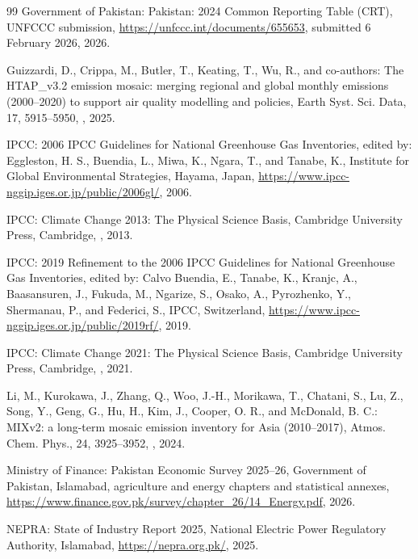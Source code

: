 \documentclass[essd,manuscript]{copernicus}
\begin{document}
\begin{thebibliography}{99}
Government of Pakistan: Pakistan: 2024 Common Reporting Table (CRT), UNFCCC submission, \url{https://unfccc.int/documents/655653}, submitted 6 February 2026, 2026.

Guizzardi, D., Crippa, M., Butler, T., Keating, T., Wu, R., and co-authors: The HTAP\_v3.2 emission mosaic: merging regional and global monthly emissions (2000--2020) to support air quality modelling and policies, Earth Syst. Sci. Data, 17, 5915--5950, , 2025.

IPCC: 2006 IPCC Guidelines for National Greenhouse Gas Inventories, edited by: Eggleston, H. S., Buendia, L., Miwa, K., Ngara, T., and Tanabe, K., Institute for Global Environmental Strategies, Hayama, Japan, \url{https://www.ipcc-nggip.iges.or.jp/public/2006gl/}, 2006.

IPCC: Climate Change 2013: The Physical Science Basis, Cambridge University Press, Cambridge, , 2013.

IPCC: 2019 Refinement to the 2006 IPCC Guidelines for National Greenhouse Gas Inventories, edited by: Calvo Buendia, E., Tanabe, K., Kranjc, A., Baasansuren, J., Fukuda, M., Ngarize, S., Osako, A., Pyrozhenko, Y., Shermanau, P., and Federici, S., IPCC, Switzerland, \url{https://www.ipcc-nggip.iges.or.jp/public/2019rf/}, 2019.

IPCC: Climate Change 2021: The Physical Science Basis, Cambridge University Press, Cambridge, , 2021.

Li, M., Kurokawa, J., Zhang, Q., Woo, J.-H., Morikawa, T., Chatani, S., Lu, Z., Song, Y., Geng, G., Hu, H., Kim, J., Cooper, O. R., and McDonald, B. C.: MIXv2: a long-term mosaic emission inventory for Asia (2010--2017), Atmos. Chem. Phys., 24, 3925--3952, , 2024.

Ministry of Finance: Pakistan Economic Survey 2025--26, Government of Pakistan, Islamabad, agriculture and energy chapters and statistical annexes, \url{https://www.finance.gov.pk/survey/chapter_26/14_Energy.pdf}, 2026.

NEPRA: State of Industry Report 2025, National Electric Power Regulatory Authority, Islamabad, \url{https://nepra.org.pk/}, 2025.


\end{thebibliography}
\end{document}
